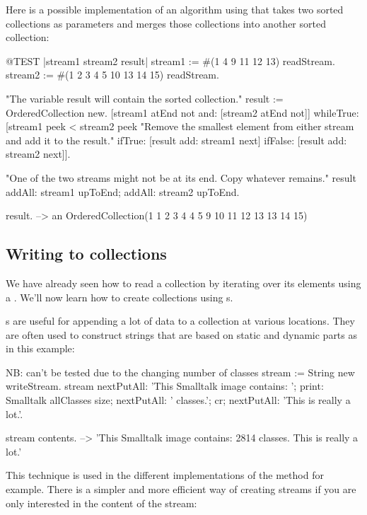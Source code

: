 \documentclass[a4paper,10pt,twoside]{book}
\begin{document}
Here is a possible implementation of an algorithm using  that takes two sorted collections as parameters and merges those collections into another sorted collection:

\begin{code}{@TEST |stream1 stream2 result|}
stream1 := #(1 4 9 11 12 13) readStream.
stream2 := #(1 2 3 4 5 10 13 14 15) readStream.

"The variable result will contain the sorted collection."
result := OrderedCollection new.
[stream1 atEnd not and: [stream2 atEnd not]]
	whileTrue: [stream1 peek < stream2 peek
		"Remove the smallest element from either stream and add it to the result."
		ifTrue: [result add: stream1 next]
		ifFalse: [result add: stream2 next]].

"One of the two streams might not be at its end. Copy whatever remains."
result
	addAll: stream1 upToEnd;
	addAll: stream2 upToEnd.

result. -->   an OrderedCollection(1 1 2 3 4 4 5 9 10 11 12 13 13 14 15)
\end{code}

\subsection{Writing to collections}

We have already seen how to read a collection by iterating over its elements using a .
We'll now learn how to create collections using s.

s are useful for appending a lot of data to a collection at various locations.
They are often used to construct strings that are based on static and dynamic parts as in this example:

\begin{code}{NB: can't be tested due to the changing number of classes}
stream := String new writeStream.
stream
	nextPutAll: 'This Smalltalk image contains: ';
	print: Smalltalk allClasses size;
	nextPutAll: ' classes.';
	cr;
	nextPutAll: 'This is really a lot.'.

stream contents. --> 'This Smalltalk image contains: 2814 classes.
This is really a lot.'
\end{code}

This technique is used in the different implementations of the method  for example.
There is a simpler and more efficient way of creating streams if you are only interested in the content of the stream:
\end{document}
